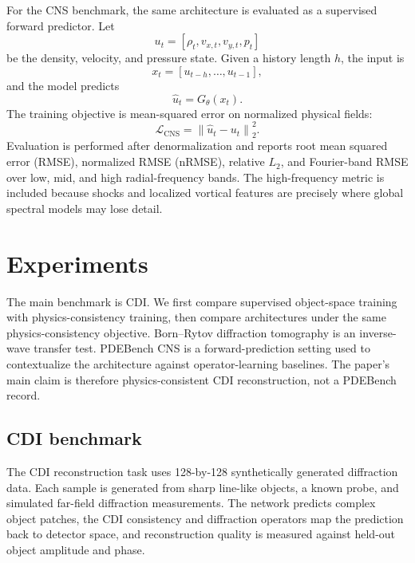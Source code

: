 \documentclass[11pt]{article}
\begin{document}
For the CNS benchmark, the same architecture is evaluated as a supervised
forward predictor. Let
\begin{equation}
  u_t = [\rho_t, v_{x,t}, v_{y,t}, p_t]
\end{equation}
be the density, velocity, and pressure state. Given a history length $h$, the
input is
\begin{equation}
  x_t = [u_{t-h}, \ldots, u_{t-1}],
\end{equation}
and the model predicts
\begin{equation}
  \hat{u}_t = G_{\theta}(x_t).
\end{equation}
The training objective is mean-squared error on normalized physical fields:
\begin{equation}
  \mathcal{L}_{\mathrm{CNS}}
  = \left\|\hat{u}_t - u_t\right\|_2^2.
\end{equation}
Evaluation is performed after denormalization and reports root mean squared
error (RMSE), normalized RMSE (nRMSE), relative $L_2$, and Fourier-band RMSE
over low, mid, and high radial-frequency bands. The
high-frequency metric is included because shocks and localized vortical features
are precisely where global spectral models may lose detail.

\section{Experiments}

The main benchmark is CDI. We first compare supervised
object-space training with physics-consistency training, then compare
architectures under the same physics-consistency objective. Born--Rytov
diffraction tomography is an inverse-wave transfer test. PDEBench CNS is a
forward-prediction setting used to contextualize the architecture against
operator-learning baselines. The paper's main claim is therefore physics-consistent
CDI reconstruction, not a PDEBench record.

\subsection{CDI benchmark}

The CDI reconstruction task uses 128-by-128 synthetically generated diffraction
data. Each sample is generated from sharp line-like objects, a known probe, and
simulated far-field diffraction measurements. The network predicts complex
object patches, the CDI consistency and diffraction operators map the prediction
back to detector space, and reconstruction quality is measured against held-out
object amplitude and phase.
\end{document}
